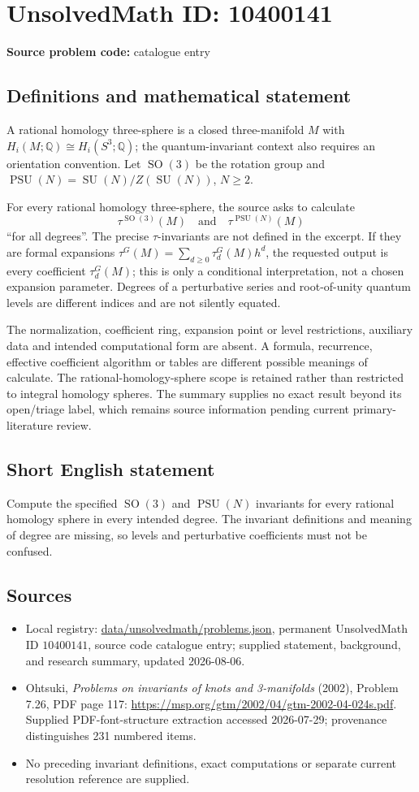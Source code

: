 \documentclass[11pt]{article}
\begin{document}
\section*{UnsolvedMath ID: 10400141}
\textbf{Source problem code:} catalogue entry
\subsection{Definitions and mathematical statement}
A rational homology three-sphere is a closed three-manifold \(M\) with \(H_i(M;\mathbb Q)\cong H_i(S^3;\mathbb Q)\); the quantum-invariant context also requires an orientation convention. Let \(\operatorname{SO}(3)\) be the rotation group and \(\operatorname{PSU}(N)=\operatorname{SU}(N)/Z(\operatorname{SU}(N))\), \(N\ge2\).

For every rational homology three-sphere, the source asks to calculate
\[
 \tau^{\operatorname{SO}(3)}(M)\quad\text{and}\quad
 \tau^{\operatorname{PSU}(N)}(M)
\]
``for all degrees''. The precise \(\tau\)-invariants are not defined in the excerpt. If they are formal expansions \(\tau^G(M)=\sum_{d\ge0}\tau_d^G(M)h^d\), the requested output is every coefficient \(\tau_d^G(M)\); this is only a conditional interpretation, not a chosen expansion parameter. Degrees of a perturbative series and root-of-unity quantum levels are different indices and are not silently equated.

The normalization, coefficient ring, expansion point or level restrictions, auxiliary data and intended computational form are absent. A formula, recurrence, effective coefficient algorithm or tables are different possible meanings of calculate. The rational-homology-sphere scope is retained rather than restricted to integral homology spheres. The summary supplies no exact result beyond its open/triage label, which remains source information pending current primary-literature review.
\subsection{Short English statement}
Compute the specified \(\operatorname{SO}(3)\) and \(\operatorname{PSU}(N)\) invariants for every rational homology sphere in every intended degree. The invariant definitions and meaning of degree are missing, so levels and perturbative coefficients must not be confused.
\subsection{Sources}
\begin{itemize}
\item Local registry: \url{data/unsolvedmath/problems.json}, permanent UnsolvedMath ID \(10400141\), source code catalogue entry; supplied statement, background, and research summary, updated 2026-08-06.
\item Ohtsuki, \emph{Problems on invariants of knots and 3-manifolds} (2002), Problem 7.26, PDF page 117: \url{https://msp.org/gtm/2002/04/gtm-2002-04-024s.pdf}. Supplied PDF-font-structure extraction accessed 2026-07-29; provenance distinguishes 231 numbered items.
\item No preceding invariant definitions, exact computations or separate current resolution reference are supplied.
\end{itemize}
\end{document}
